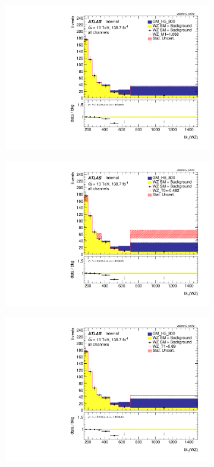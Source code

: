 \documentclass[../Bachelorarbeit.tex]{subfiles}
\begin{document}
\begin{figure}
\begin{subfigure}{0.3\textwidth}
        \includegraphics[width=\textwidth]{Plots/ALL_MTWZ_final/GM_H5_800/M1/2022-04-21/VBSSR/all_VV_MTWZ.pdf}
    \end{subfigure}
    \begin{subfigure}{0.3\textwidth}
        \includegraphics[width=\textwidth]{Plots/ALL_MTWZ_final/GM_H5_800/T0/2022-04-21/VBSSR/all_VV_MTWZ.pdf}
    \end{subfigure}
    \begin{subfigure}{0.3\textwidth}
        \includegraphics[width=\textwidth]{Plots/ALL_MTWZ_final/GM_H5_800/T1/2022-04-21/VBSSR/all_VV_MTWZ.pdf}

\end{subfigure}
\end{figure}
\end{document}

